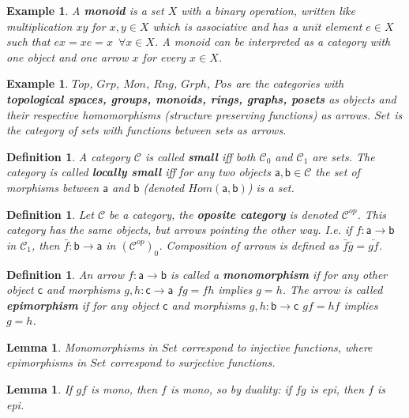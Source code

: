 \documentclass{article}
\newcommand{\cat}[1]{\mathcal{#1}} %
\newcommand{\cato}[1]{\cat{#1}_0} %
\newcommand{\catm}[1]{\cat{#1}_1} %
\newcommand{\ob}[1]{\mathsf{#1}} %
\newcommand{\catop}[1]{\cat{#1}^{op}}
\newcommand{\catopo}[1]{(\catop{#1})_0}
\newcommand{\all}{\enspace \forall}
\newcommand{\allin}[2]{\all #1 \in #2}
\newtheorem{lemma}[theorem]{Lemma}
\newtheorem{definition}[theorem]{Definition}
\newtheorem{example}[theorem]{Example}
\begin{document}
\begin{example}
	A \textbf{monoid} is a set $X$ with a binary operation, written like multiplication $xy$ for $x,y \in X$ which is associative and has a unit element $e \in X$ such that $ex = xe = x \allin{x}{X}$.
	A monoid can be interpreted as a category with one object and one arrow $x$ for every $x \in X$.
\end{example}

\begin{example}
	$Top$, $Grp$, $Mon$, $Rng$, $Grph$, $Pos$ are the categories with \textbf{topological spaces, groups, monoids, rings, graphs, posets} as objects and their respective homomorphisms (structure preserving functions) as arrows.
	$Set$ is the category of sets with functions between sets as arrows.
\end{example}

\begin{definition}
	A category $\cat{C}$ is called \textbf{small} iff both $\cato{C}$ and $\catm{C}$ are sets. The category is called \textbf{locally small}
	iff for any two objects $\ob{a},\ob{b} \in \cat{C}$ the set of morphisms between $\ob{a}$ and $\ob{b}$ (denoted $Hom(\ob{a},\ob{b})$) is a set.
\end{definition}

\begin{definition}
	Let $\cat{C}$ be a category, the \textbf{oposite category} is denoted $\catop{C}$. This category has the same objects, but arrows pointing the other way.
	I.e. if $f: \ob{a} \rightarrow \ob{b}$ in $\catm{C}$, then $\bar{f}: \ob{b} \rightarrow \ob{a}$ in $\catopo{C}$. Composition of arrows is defined as $\bar{f}\bar{g} = \bar{gf}$.
\end{definition}

\begin{definition}
	An arrow $f: \ob{a} \rightarrow \ob{b}$ is called a \textbf{monomorphism} if for any other object $\ob{c}$ and morphisms $g,h: \ob{c} \rightarrow \ob{a}$ $fg = fh$ implies $g=h$.
	The arrow is called \textbf{epimorphism} if for any object $\ob{c}$ and morphisms $g,h: \ob{b} \rightarrow \ob{c}$ $gf = hf$ implies $g=h$.
\end{definition}

\begin{lemma}
	Monomorphisms in $Set$ correspond to injective functions, where epimorphisms in $Set$ correspond to surjective functions.
\end{lemma}

\begin{lemma}
	If $gf$ is mono, then $f$ is mono, so by duality: if $fg$ is epi, then $f$ is epi.
\end{lemma}
\end{document}
